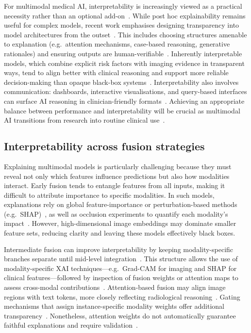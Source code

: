 \documentclass[final,british,a4paper,12pt]{phdthesis}
\begin{document}
For multimodal medical AI, interpretability is increasingly viewed as a practical necessity rather than an optional add-on~\cite{napravnik2025lessons,vani2025personalized}. While post hoc explainability remains useful for complex models, recent work emphasises designing transparency into model architectures from the outset~\cite{singh2025beyond}. This includes choosing structures amenable to explanation (e.g.\ attention mechanisms, case-based reasoning, generative rationales) and ensuring outputs are human-verifiable~\cite{sharma2025xai}. Inherently interpretable models, which combine explicit risk factors with imaging evidence in transparent ways, tend to align better with clinical reasoning and support more reliable decision-making than opaque black-box systems~\cite{houssein2025explainable,vani2025personalized,jungmann2023algorithmic}. Interpretability also involves communication: dashboards, interactive visualisations, and query-based interfaces can surface AI reasoning in clinician-friendly formats~\cite{pahud2024orchestrating,sharma2025xai}. Achieving an appropriate balance between performance and interpretability will be crucial as multimodal AI transitions from research into routine clinical use~\cite{vani2025personalized,chen2022explainable}.

\subsection{Interpretability across fusion strategies}

Explaining multimodal models is particularly challenging because they must reveal not only which features influence predictions but also how modalities interact. Early fusion tends to entangle features from all inputs, making it difficult to attribute importance to specific modalities. In such models, explanations rely on global feature-importance or perturbation-based methods (e.g.\ SHAP)~\cite{sharma2025xai,vani2025personalized}, as well as occlusion experiments to quantify each modality’s impact~\cite{vani2025personalized}. However, high-dimensional image embeddings may dominate smaller feature sets, reducing clarity and leaving these models effectively black boxes.

Intermediate fusion can improve interpretability by keeping modality-specific branches separate until mid-level integration~\cite{stahlschmidt2022}. This structure allows the use of modality-specific XAI techniques—e.g.\ Grad-CAM for imaging and SHAP for clinical features—followed by inspection of fusion weights or attention maps to assess cross-modal contributions~\cite{sharma2025xai}. Attention-based fusion may align image regions with text tokens, more closely reflecting radiological reasoning~\cite{sharma2025xai}. Gating mechanisms that assign instance-specific modality weights offer additional transparency~\cite{sharma2025xai}. Nonetheless, attention weights do not automatically guarantee faithful explanations and require validation~\cite{napravnik2025lessons,pahud2024orchestrating}.
\end{document}
